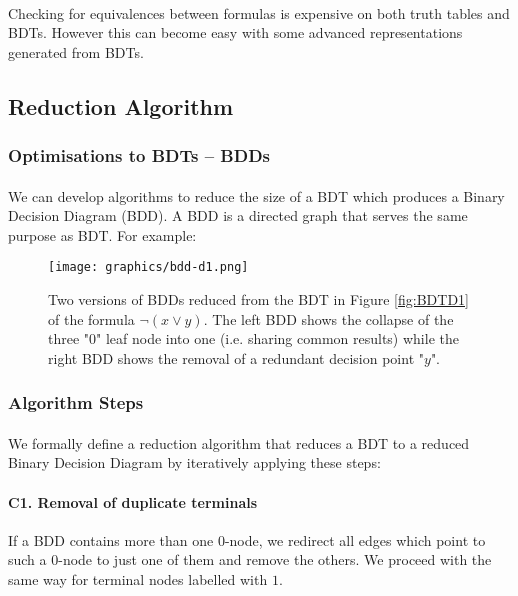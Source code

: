 \documentclass{article}
\theoremstyle{plain}
\theoremstyle{definition}
\begin{document}
\begin{multicols}{2}
\paragraph{} Checking for equivalences between formulas is expensive on both truth tables and BDTs. However this can become easy with some advanced representations generated from BDTs.

\subsection{Reduction Algorithm}

\subsubsection{Optimisations to BDTs -- BDDs}

\paragraph{} We can develop algorithms to reduce the size of a BDT which produces a Binary Decision Diagram (BDD). A BDD is a directed graph that serves the same purpose as BDT. For example:

\begin{figure}[H]
\centering
\texttt{[image: graphics/bdd-d1.png]}
\caption{Two versions of BDDs reduced from the BDT in Figure \ref{fig:BDTD1} of the formula $\lnot(x \lor y)$. The left BDD shows the collapse of the three "0" leaf node into one (i.e. sharing common results) while the right BDD shows the removal of a redundant decision point "$y$".}
\end{figure}

\subsubsection{Algorithm Steps}

\paragraph{} We formally define a reduction algorithm that reduces a BDT to a reduced Binary Decision Diagram by iteratively applying these steps:

\paragraph{C1. Removal of duplicate terminals} If a BDD contains more than one $0$-node, we redirect all edges which point to such a $0$-node to just one of them and remove the others. We proceed with the same way for terminal nodes labelled with $1$.


\end{multicols}
\end{document}
